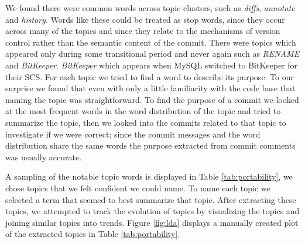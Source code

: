 \documentclass[times, 10pt,twocolumn]{article}
\begin{document}
We found there were common words across topic clusters, such as
\emph{diffs}, \emph{annotate} and \emph{history}.
Words like these could be treated as stop words, since they occur
across many of the topics and since they relate to the mechanisms of
version control rather than the semantic content of the commit.
There were topics which appeared only during some transitional period and never again
such as \emph{RENAME} and \emph{BitKeeper}. \emph{BitKeeper} which appears when MySQL switched to  BitKeeper for their SCS.
For each topic we tried to find a word to describe its purpose.
To our surprise we found that even with only a
little familiarity with the code base that naming the topic was
straightforward. To find the purpose of a commit we looked at the most
frequent words in the word distribution of the topic and tried to
summarize the topic, then we looked into the commits related to that
topic to investigate if we were correct; since the commit messages and
the word distribution share the same words the purpose extracted from
commit comments was usually accurate.


A sampling of the notable topic words is displayed in Table
\ref{tab:portability}, we chose topics that we felt confident we could
name.  To name each topic we selected a term that seemed to best
summarize that topic.  After extracting these topics, we attempted to
track the evolution of topics by visualizing the topics and joining
similar topics into trends.  Figure \ref{fig:lda} displays a manually
created plot of the extracted topics in Table
\ref{tab:portability}.
\end{document}
